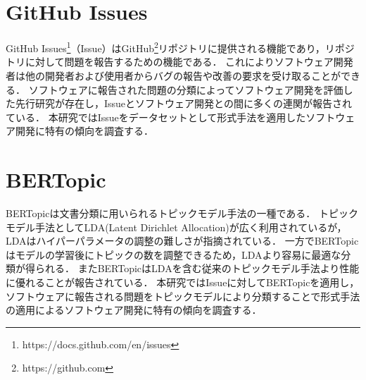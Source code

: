 \documentclass[main]{subfiles}
\begin{document}
\section{GitHub Issues}

GitHub Issues\footnote{https://docs.github.com/en/issues}（Issue）はGitHub\footnote{https://github.com}リポジトリに提供される機能であり，リポジトリに対して問題を報告するための機能である．
これによりソフトウェア開発者は他の開発者および使用者からバグの報告や改善の要求を受け取ることができる．
ソフトウェアに報告された問題の分類によってソフトウェア開発を評価した先行研究が存在し\cite{hall:2001}，Issueとソフトウェア開発との間に多くの連関が報告されている\cite{bissyande:2013}．
本研究ではIssueをデータセットとして形式手法を適用したソフトウェア開発に特有の傾向を調査する．

\section{BERTopic}

BERTopicは文書分類に用いられるトピックモデル手法の一種である．
トピックモデル手法としてLDA(Latent Dirichlet Allocation)が広く利用されているが，LDAはハイパーパラメータの調整の難しさが指摘されている\cite{panichella:2021}．
一方でBERTopicはモデルの学習後にトピックの数を調整できるため，LDAより容易に最適な分類が得られる．
またBERTopicはLDAを含む従来のトピックモデル手法より性能に優れることが報告されている\cite{egger:2022}．
本研究ではIssueに対してBERTopicを適用し，ソフトウェアに報告される問題をトピックモデルにより分類することで形式手法の適用によるソフトウェア開発に特有の傾向を調査する．
\end{document}
